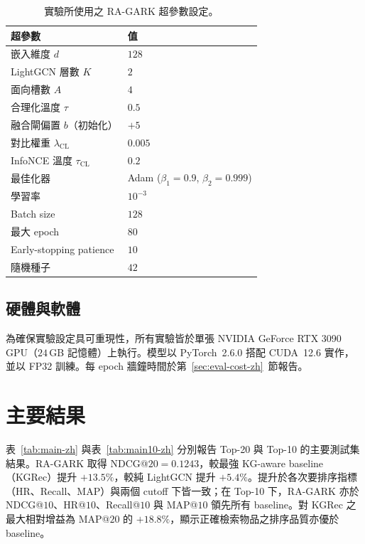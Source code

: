 \begin{table}[H]
\centering
\caption{實驗所使用之 RA-GARK 超參數設定。}
\label{tab:hparams-zh}
\begin{tabular}{ll}
\toprule
超參數 & 值 \\
\midrule
嵌入維度 $d$                       & $128$ \\
LightGCN 層數 $K$                  & $2$ \\
面向槽數 $A$                       & $4$ \\
合理化溫度 $\tau$                  & $0.5$ \\
融合閘偏置 $b$（初始化）           & $+5$ \\
對比權重 $\lambda_{\mathrm{CL}}$   & $0.005$ \\
InfoNCE 溫度 $\tau_{\mathrm{CL}}$  & $0.2$ \\
最佳化器                           & Adam ($\beta_1{=}0.9$, $\beta_2{=}0.999$) \\
學習率                             & $10^{-3}$ \\
Batch size                         & $128$ \\
最大 epoch                         & $80$ \\
Early-stopping patience            & $10$ \\
隨機種子                           & $42$ \\
\bottomrule
\end{tabular}
\end{table}
\FloatBarrier

\subsection{硬體與軟體}
\label{sec:eval-env-zh}

為確保實驗設定具可重現性，所有實驗皆於單張 NVIDIA GeForce RTX 3090 GPU（$24$\,GB 記憶體）上執行。模型以 PyTorch~2.6.0 搭配 CUDA~12.6 實作，並以 FP32 訓練。每 epoch 牆鐘時間於第~\ref{sec:eval-cost-zh}~節報告。

\section{主要結果}
\label{sec:eval-main-zh}

表~\ref{tab:main-zh} 與表~\ref{tab:main10-zh} 分別報告 Top-20 與 Top-10 的主要測試集結果。RA-GARK 取得 NDCG@$20 = 0.1243$，較最強 KG-aware baseline（KGRec）提升 $+13.5\%$，較純 LightGCN 提升 $+5.4\%$。提升於各次要排序指標（HR、Recall、MAP）與兩個 cutoff 下皆一致；在 Top-10 下，RA-GARK 亦於 NDCG@$10$、HR@$10$、Recall@$10$ 與 MAP@$10$ 領先所有 baseline。對 KGRec 之最大相對增益為 MAP@$20$ 的 $+18.8\%$，顯示正確檢索物品之排序品質亦優於 baseline。

